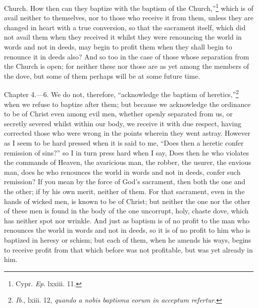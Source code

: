 Church. How then can they baptize with the baptism of the Church,''\footnote{\par  Cypr. \emph{Ep}. lxxiii. 11.} which is of avail neither to themselves, nor to those who receive it from them, unless they are changed in heart with a true conversion, so that the sacrament itself, which did not avail them when they received it whilst they were renouncing the world in words and not in deeds, may begin to profit them when they shall begin to renounce it in deeds also? And so too in the case of those whose separation from the Church is open; for neither these nor those are as yet among the members of the dove, but some of them perhaps will be at some future time.


Chapter 4.—6. We do not, therefore, ``acknowledge the baptism of heretics,''\footnote{\par  \emph{Ib}., lxiii. 12, \emph{quando a nobis baptisma eorum in acceptum refertur}.} when we refuse to baptize after them; but because we acknowledge the ordinance to be of Christ even among evil men, whether openly separated from us, or secretly severed whilst within our body, we receive it with due respect, having corrected those who were wrong in the points wherein they went astray. However as I seem to be hard pressed when it is said to me, ``Does then a heretic confer remission of sins?'' so I in turn press hard when I say, Does then he who violates the commands of Heaven, the avaricious man, the robber, the usurer, the envious man, does he who renounces the world in words and not in deeds, confer such remission? If you mean by the force of God’s sacrament, then both the one and the other; if by his own merit, neither of them. For that sacrament, even in the hands of wicked men, is known to be of Christ; but neither the one nor the other of these men is found in the body of the one uncorrupt, holy, chaste dove, which has neither spot nor wrinkle. And just as baptism is of no profit to the man who renounces the world in words and not in deeds, so it is of no profit to him who is baptized in heresy or schism; but each of them, when he amends his ways, begins to receive profit from that which before was not profitable, but was yet already in him.

